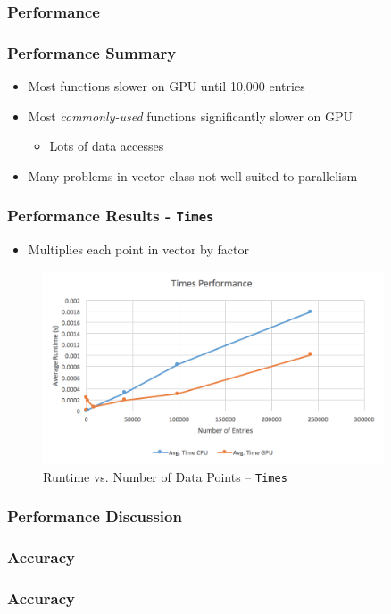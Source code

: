 \documentclass{beamer}
\newcommand{\textapprox}{\raisebox{0.5ex}{\texttildelow}}
\begin{document}
\subsubsection{Performance}
\begin{frame}
\frametitle{Performance Summary}
\begin{itemize}
\item Most functions slower on GPU until \textapprox 10,000 entries 
\item Most \emph{commonly-used} functions significantly slower on GPU
\begin{itemize}
\item Lots of data accesses
\end{itemize}
\item Many problems in vector class not well-suited to parallelism
\end{itemize}
\end{frame}

\begin{frame}
\frametitle{Performance Results - \texttt{Times}}
\begin{itemize}
\item Multiplies each point in vector by factor
\end{itemize}
\begin{figure}
\centering
\includegraphics[width=0.9\textwidth]{images/times_line.png}
\caption{Runtime vs. Number of Data Points -- \texttt{Times}}
\end{figure}
\end{frame}

\begin{frame}
\frametitle{Performance Discussion}
\end{frame}

\subsubsection{Accuracy}
\begin{frame}
\frametitle{Accuracy}
\end{frame}
\end{document}
